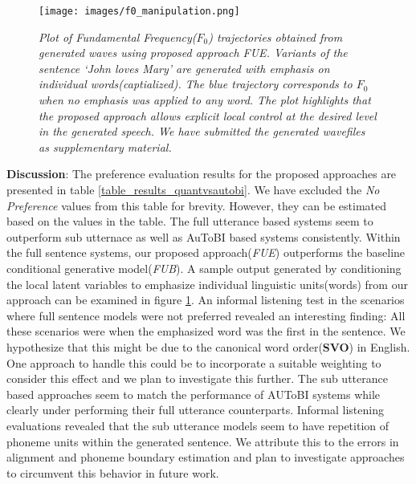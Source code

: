 \begin{figure}[t]
\centering
\texttt{[image: images/f0\_manipulation.png]}
\caption{\textit{Plot of Fundamental Frequency($F_0$) trajectories obtained from generated waves using proposed approach \textit{FUE}. Variants of the sentence `John loves Mary' are generated with emphasis on individual words(captialized). The blue trajectory corresponds to $F_0$ when no emphasis was applied to any word. The plot highlights that the proposed approach allows explicit local control at the desired level in the generated speech. We have submitted the generated wavefiles as supplementary material.}} 
\label{plot_overview}
\end{figure}  



\textbf{Discussion}: The preference evaluation results for the proposed approaches are presented in table \ref{table_results_quantvsautobi}.  We have excluded the \textit{No Preference} values from this table for brevity. However, they can be estimated based on the values in the table. The full utterance based systems seem to outperform sub utternace as well as AuToBI based systems consistently. Within the full sentence systems,  our proposed approach(\textit{FUE}) outperforms the baseline conditional generative model(\textit{FUB}). A sample output generated by conditioning the local latent variables to emphasize individual linguistic units(words) from our approach can be examined in figure \ref{plot_overview}. An informal listening test in the scenarios where full sentence models were not preferred revealed an interesting finding: All these scenarios were when the emphasized word was the first in the sentence. We hypothesize that this might be due to the canonical word order(\textbf{SVO}) in English. One approach to handle this could be to incorporate a suitable weighting to consider this effect and we plan to investigate this further.  The sub utterance based approaches seem to match the performance of AUToBI systems while clearly under performing their full utterance counterparts. Informal listening evaluations revealed that the sub utterance models seem to have repetition of phoneme units within the generated sentence. We attribute this to the errors in alignment and phoneme boundary estimation and plan to investigate approaches to circumvent this behavior in future work. 


